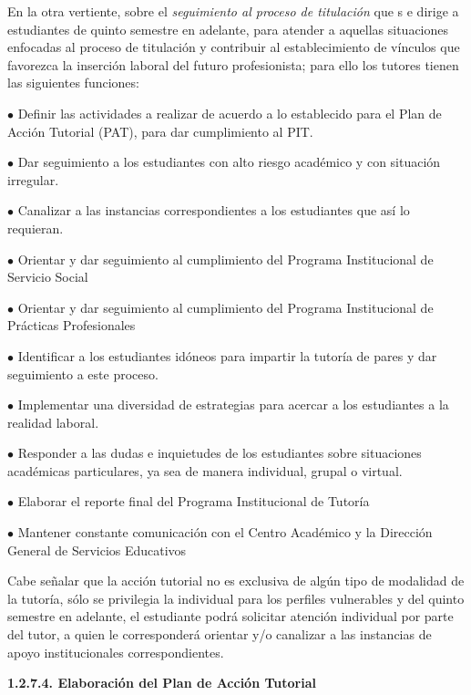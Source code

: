 En la otra vertiente, sobre el \textit{seguimiento al proceso de titulación} que s
e dirige a estudiantes de quinto semestre en adelante, para atender a
aquellas situaciones enfocadas al proceso de titulación y contribuir al
establecimiento de vínculos que favorezca la inserción laboral del futuro
profesionista; para ello los tutores tienen las siguientes funciones:

\begin{Obs}
\item[$\bullet$] Definir las actividades a realizar de acuerdo a lo establecido para el
Plan de Acción Tutorial (PAT), para dar cumplimiento al PIT.
\item[$\bullet$] Dar seguimiento a los estudiantes con alto riesgo académico y con
situación irregular.
\item[$\bullet$] Canalizar a las instancias correspondientes a los estudiantes que así lo
requieran.
\item[$\bullet$] Orientar y dar seguimiento al cumplimiento del Programa Institucional de
Servicio Social
\item[$\bullet$] Orientar y dar seguimiento al cumplimiento del Programa Institucional de
Prácticas Profesionales
\item[$\bullet$] Identificar a los estudiantes idóneos para impartir la tutoría de pares y
dar seguimiento a este proceso.
\item[$\bullet$] Implementar una diversidad de estrategias para acercar a los estudiantes
a la realidad laboral.
\item[$\bullet$] Responder a las dudas e inquietudes de los estudiantes sobre situaciones
académicas particulares, ya sea de manera individual, grupal o virtual.
\item[$\bullet$] Elaborar el reporte final del Programa Institucional de Tutoría
\item[$\bullet$] Mantener constante comunicación con el Centro Académico y la Dirección
General de Servicios Educativos
\end{Obs}

Cabe señalar que la acción tutorial no es exclusiva de algún tipo de
modalidad de la tutoría, sólo se privilegia la individual para los perfiles
vulnerables y del quinto semestre en adelante, el estudiante podrá
solicitar atención individual por parte del tutor, a quien le corresponderá
orientar y/o canalizar a las instancias de apoyo institucionales
correspondientes.


\medskip
{\bfseries 1.2.7.4. Elaboración del Plan de Acción Tutorial}

